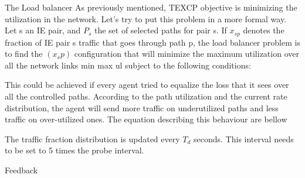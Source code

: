 The Load balancer
As previously mentioned, TEXCP objective is minimizing the utilization in the network. Let's try to put this problem in a more formal way. Let s an IE pair, and $P_s$ the set of selected paths for pair s. If $x_{sp}$ denotes the fraction of IE pair s traffic that goes through path p, the load balancer problem is to find the $(x_sp)$ configuration that will minimize the maximum utilization over all the network links 
min max ul
subject to the following conditions:

This could be achieved if every agent tried to equalize the loss that it sees over all the controlled paths. According to the path utilization and the current rate distribution, the agent will send more traffic on underutilized paths and less traffic on over-utilized ones. 
The equation describing this behaviour are bellow

The traffic fraction distribution is updated every $T_d$ seconds. This interval needs to be set to 5 times the probe interval.

Feedback

